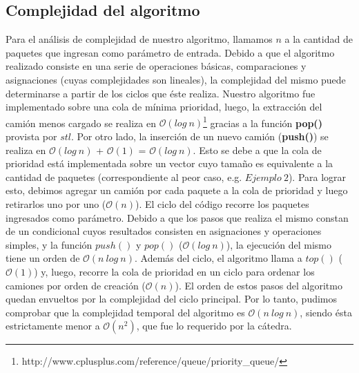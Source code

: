 \subsection{Complejidad del algoritmo}
Para el análisis de complejidad de nuestro algoritmo, llamamos $n$ a la cantidad de paquetes que ingresan como parámetro de entrada.\newline
\newline
Debido a que el algoritmo realizado consiste en una serie de operaciones básicas, comparaciones y asignaciones (cuyas complejidades son lineales), la complejidad del mismo puede determinarse a partir de los ciclos que éste realiza.\newline
\newline
Nuestro algoritmo fue implementado sobre una cola de mínima prioridad, luego, la extracción del camión menos cargado se realiza en $\mathcal{O}(log\ n)$\footnote{http://www.cplusplus.com/reference/queue/priority\_queue/} gracias a la función \textbf{pop()} provista por $stl$.\newline
\newline
Por otro lado, la inserción de un nuevo camión (\textbf{push()}) se realiza en $\mathcal{O}(log\ n)$ + $\mathcal{O}(1)$ = $\mathcal{O}(log\ n)$\footnotemark[1]. Esto se debe a que la cola de prioridad está implementada sobre un vector cuyo tamaño es equivalente a la cantidad de paquetes (correspondiente al peor caso, e.g. $Ejemplo\ 2$). Para lograr esto, debimos agregar un camión por cada paquete a la cola de prioridad y luego retirarlos uno por uno ($\mathcal{O}(n)$).\newline
\newline
El ciclo del código recorre los paquetes ingresados como parámetro. Debido a que los pasos que realiza el mismo constan de un condicional cuyos resultados consisten en asignaciones y operaciones simples, y la función $push()$ y $pop()$ ($\mathcal{O}(log\ n)$), la ejecución del mismo tiene un orden de $\mathcal{O}(n\ log\ n)$.\newline
\newline
Además del ciclo, el algoritmo llama a $top()$ ($\mathcal{O}(1)$\footnotemark[1]) y, luego, recorre la cola de prioridad en un ciclo para ordenar los camiones por orden de creación ($\mathcal{O}(n)$). El orden de estos pasos del algoritmo quedan envueltos por la complejidad del ciclo principal. Por lo tanto, pudimos comprobar que la complejidad temporal del algoritmo es $\mathcal{O}(n\ log\ n)$, siendo ésta estrictamente menor a $\mathcal{O}(n^2)$, que fue lo requerido por la cátedra.

